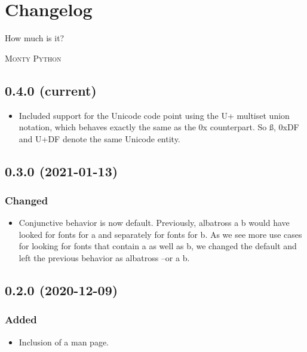 \documentclass[12pt,article,a4paper,oneside]{memoir}
\newcommand{\command}[1]{{\ttfamily#1}}
\newcommand{\glyph}[1]{{\ttfamily#1}}
\newcommand{\hex}[1]{{\ttfamily0x#1}}
\newcommand{\uno}[1]{{\ttfamily U+#1}}
\begin{document}
\chapter*{Changelog}

\epigraph{How much is it?}{\textsc{Monty Python}}

\section*{0.4.0 (current)}

\begin{itemize}[label={--}]
\item Included support for the Unicode code point using the \uno{} multiset union
notation, which behaves exactly the same as the \hex{} counterpart. So \glyph{ß},
\hex{DF} and \uno{DF} denote the same Unicode entity. 
\end{itemize}

\section*{0.3.0 (2021-01-13)}

\subsection*{Changed}

\begin{itemize}[label={--}]
\item Conjunctive behavior is now default. Previously, \command{albatross a b}
would have looked for fonts for \glyph{a} and separately for fonts for \glyph{b}.
As we see more use cases for looking for fonts that contain \glyph{a} as well as
\glyph{b}, we changed the default and left the previous behavior as
\command{albatross --or a b}.
\end{itemize}

\section*{0.2.0 (2020-12-09)}

\subsection*{Added}

\begin{itemize}[label={--}]
\item Inclusion of a man page.
\end{itemize}
\end{document}
